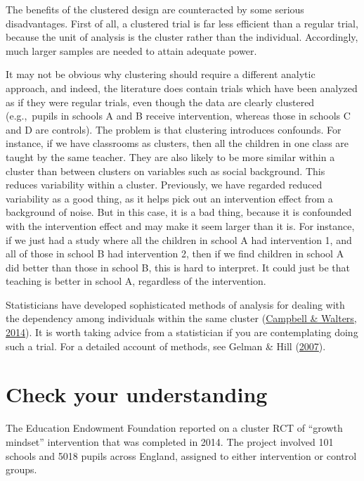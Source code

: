 \documentclass{krantz}
\begin{document}
The benefits of the clustered design are counteracted by some serious disadvantages. First of all, a clustered trial is far less efficient than a regular trial, because the unit of analysis is the cluster rather than the individual. Accordingly, much larger samples are needed to attain adequate power.

It may not be obvious why clustering should require a different analytic approach, and indeed, the literature does contain trials which have been analyzed as if they were regular trials, even though the data are clearly clustered (e.g.,~pupils in schools A and B receive intervention, whereas those in schools C and D are controls). The problem is that clustering introduces confounds. For instance, if we have classrooms as clusters, then all the children in one class are taught by the same teacher. They are also likely to be more similar within a cluster than between clusters on variables such as social background. This reduces variability within a cluster. Previously, we have regarded reduced variability as a good thing, as it helps pick out an intervention effect from a background of noise. But in this case, it is a bad thing, because it is confounded with the intervention effect and may make it seem larger than it is. For instance, if we just had a study where all the children in school A had intervention 1, and all of those in school B had intervention 2, then if we find children in school A did better than those in school B, this is hard to interpret. It could just be that teaching is better in school A, regardless of the intervention.

Statisticians have developed sophisticated methods of analysis for dealing with the dependency among individuals within the same cluster (\protect\hyperlink{ref-campbell2014}{Campbell \& Walters, 2014}). It is worth taking advice from a statistician if you are contemplating doing such a trial. For a detailed account of methods, see Gelman \& Hill (\protect\hyperlink{ref-gelman2007}{2007}).

\hypertarget{check-your-understanding-17}{%
\section{Check your understanding}\label{check-your-understanding-17}}

The Education Endowment Foundation reported on a cluster RCT of ``growth mindset'' intervention that was completed in 2014. The project involved 101 schools and 5018 pupils across England, assigned to either intervention or control groups.
\end{document}
